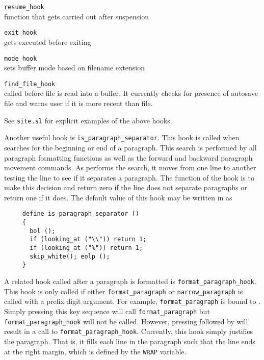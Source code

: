       \verb|resume_hook|\\
        function that gets carried out after suspension

      \verb|exit_hook|\\
        gets executed before exiting \jed{}

      \verb|mode_hook|\\
        sets buffer mode based on filename extension

      \verb|find_file_hook|\\
         called before file is read into a buffer.  It currently
         checks for presence of autosave file and warns user if
         it is more recent than file.
         
  See \verb|site.sl| for explicit examples of the above hooks.

  Another useful hook is \verb|is_paragraph_separator|.  This hook is called
  when \jed{} searches for the beginning or end of a paragraph.  This search
  is performed by all paragraph formatting functions as well as the forward
  and backward paragraph movement commands. As \jed{} performs the search,
  it moves from one line to another testing the line to see if it separates
  a paragraph.  The function of the hook is to make this decision and return
  zero if the line does not separate paragraphs or return one if it does.
  The default value of this hook may be written in \slang{} as

\begin{verbatim}
     define is_paragraph_separator ()
     {
       bol ();
       if (looking_at ("\\")) return 1;
       if (looking_at ("%")) return 1;
       skip_white(); eolp ();
     }
\end{verbatim}

  A related hook called after a paragraph is formatted is
  \verb|format_paragraph_hook|. This hook is only called if either
  \verb|format_paragraph| or \verb|narrow_paragraph| is called with a prefix
  digit argument.  For example, \verb|format_paragraph| is bound to 
  .  Simply pressing this key sequence will call 
  \verb|format_paragraph| but \verb|format_paragraph_hook| will not be called. 
  However, pressing  followed by  will
  result in a call to \verb|format_paragraph_hook|.  Currently, this hook
  simply justifies the paragraph.  That is, it fills each line in the
  paragraph such that the line ends at the right margin, which is defined by
  the \verb|WRAP| variable.

